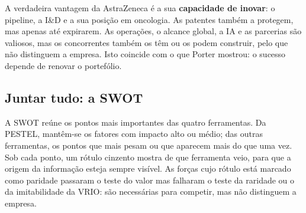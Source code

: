 \begin{analysis}
A verdadeira vantagem da AstraZeneca é a sua \textbf{capacidade de inovar}: o pipeline, a I\&D e a sua posição em oncologia. As patentes também a protegem, mas apenas até expirarem. As operações, o alcance global, a IA e as parcerias são valiosos, mas os concorrentes também os têm ou os podem construir, pelo que não distinguem a empresa. Isto coincide com o que Porter mostrou: o sucesso depende de renovar o portefólio.
\end{analysis}

\subsection{Juntar tudo: a SWOT}
A SWOT reúne os pontos mais importantes das quatro ferramentas. Da PESTEL, mantêm-se os fatores com impacto alto ou médio; das outras ferramentas, os pontos que mais pesam ou que aparecem mais do que uma vez. Sob cada ponto, um rótulo cinzento mostra de que ferramenta veio, para que a origem da informação esteja sempre visível. As forças cujo rótulo está marcado como paridade passaram o teste do valor mas falharam o teste da raridade ou o da imitabilidade da VRIO: são necessárias para competir, mas não distinguem a empresa.

